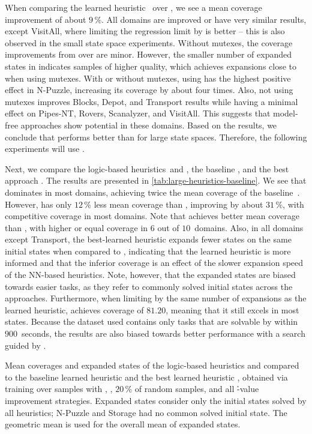 When comparing the learned heuristic~\hnnl{\rlmeanfx} over \hnnl{\rlfacts}, we see a mean coverage improvement of about $9\,\%$. All domains are improved or have very similar results, except VisitAll, where limiting the regression limit by \rlfacts is better -- this is also observed in the small state space experiments. Without mutexes, the coverage improvements from \rlmeanfx over \rlfacts are minor. However, the smaller number of expanded states in \hnnnomutexl{\rlmeanfx} indicates samples of higher quality, which achieves expansions close to when using mutexes. With or without mutexes, using \rlmeanfx has the highest positive effect in N-Puzzle, increasing its coverage by about four times. Also, not using mutexes improves Blocks, Depot, and Transport results while having a minimal effect on Pipes-NT, Rovers, Scanalyzer, and VisitAll. This suggests that model-free approaches show potential in these domains. Based on the results, we conclude that \rlmeanfx performs better than \rlfacts for large state spaces. Therefore, the following experiments will use \rlmeanfx.

Next, we compare the logic-based heuristics~\hff and \hgc, the baseline \hnnbase, and the best approach \hnnrs. The results are presented in \cref{tab:large-heuristics-baseline}. We see that \hff dominates in most domains, achieving twice the mean coverage of the baseline~\hnnbase. However, \hnnrs has only $12\,\%$ less mean coverage than \hff, improving \hnnbase by about $31\,\%$, with competitive coverage in most domains. Note that \hnnrs achieves better mean coverage than \hgc, with higher or equal coverage in $6$ out of $10$~domains. Also, in all domains except Transport, the best-learned heuristic expands fewer states on the same initial states when compared to \hff, indicating that the learned heuristic is more informed and that the inferior coverage is an effect of the slower expansion speed of the NN-based heuristics. Note, however, that the expanded states are biased towards easier tasks, as they refer to commonly solved initial states across the approaches. Furthermore, when limiting \hff by the same number of expansions as the learned heuristic, \hff achieves coverage of $81.20$, meaning that it still excels in most states. Because the dataset used contains only tasks that are solvable by \hff within $900$~seconds, the results are also biased towards better performance with a search guided by \hff. 

\begin{table}[tb]
    \caption[Results of the logic-based, baseline, and the best learned heuristics.]{Mean coverages and expanded states of the logic-based heuristics \hff and \hgc compared to the baseline learned heuristic \hnnbase and the best learned heuristic \hnnrs, obtained via training over samples with \bfsrw, \rlmeanfx, $20$\,\% of random samples, and all \h-value improvement strategies. Expanded states consider only the initial states solved by all heuristics; N-Puzzle and Storage had no common solved initial state. The geometric mean is used for the overall mean of expanded states.}
    \label{tab:large-heuristics-baseline}
    \addmargin
    \centering
    
\end{table}

